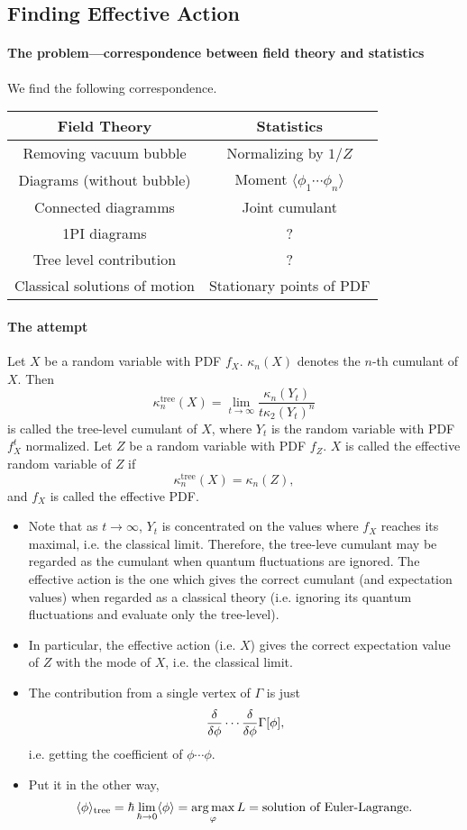 \documentclass{article}
\begin{document}
\subsection{Finding Effective Action}

\label{ssec:finding_gamma}

\paragraph*{The problem---correspondence between field theory and statistics}
We find the following correspondence.
\begin{longtable}{cc}
    Field Theory & Statistics \\
    \midrule
    Removing vacuum bubble & Normalizing by $1/Z$ \\
    Diagrams (without bubble) & Moment $\langle \phi_1\cdots \phi_n\rangle $ \\ Connected diagramms & Joint cumulant \\
    1PI diagrams & ? \\
    Tree level contribution & ? \\
    Classical solutions of motion & Stationary points of PDF \\
\end{longtable}

\paragraph*{The attempt}
Let $X$ be a random variable with PDF $f_X$.
$\kappa_n(X)$ denotes the $n$-th cumulant of $X$.
Then
\[ \kappa^{\text{tree}}_n(X) = \lim_{t\rightarrow\infty} \frac{\kappa_n(Y_t)}{t \kappa_2(Y_t)^n} \]
is called the tree-level cumulant of $X$, where $Y_t$ is the random variable with PDF $f_X^t$ normalized.
Let $Z$ be a random variable with PDF $f_Z$.
$X$ is called the effective random variable of $Z$ if
\[ \kappa_n^{\text{tree}}(X) = \kappa_n(Z), \]
and $f_X$ is called the effective PDF.

\begin{itemize}
    \item Note that as $t\rightarrow\infty$, $Y_t$ is concentrated on the values where $f_X$ reaches its maximal, i.e. the classical limit.
    Therefore, the tree-leve cumulant may be regarded as the cumulant when quantum fluctuations are ignored.
    The effective action is the one which gives the correct cumulant (and expectation values) when regarded as a classical theory (i.e. ignoring its quantum fluctuations and evaluate only the tree-level).
    \item In particular, the effective action (i.e. $X$) gives the correct expectation value of $Z$ with the mode of $X$, i.e. the classical limit.
    \item The contribution from a single vertex of $\Gamma$ is just
    \[ \fdv{\phi}\cdots \fdv{\phi}\Gamma[\phi], \]
    i.e. getting the coefficient of $\phi \cdots \phi$.
    \item Put it in the other way,
    \[ \langle \phi \rangle_{\text{tree}} = 
    \hbar \lim_{\hbar\rightarrow 0} \langle \phi \rangle = \operatorname*{arg\,max}_{\varphi} L = \text{solution of Euler-Lagrange}. \]
\end{itemize}
\end{document}
